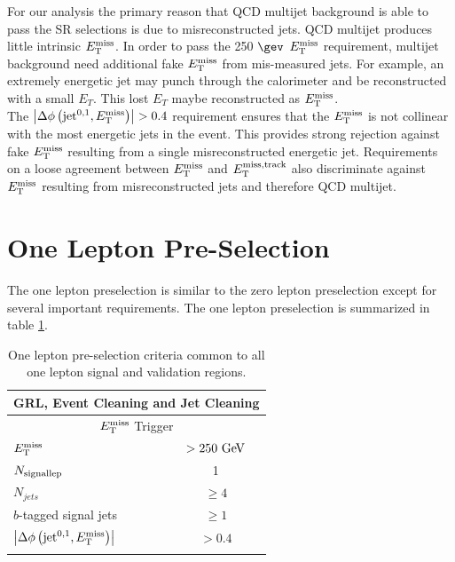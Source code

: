 \indent For our analysis the primary reason that QCD multijet background is able to pass the SR selections is due to misreconstructed jets.  QCD multijet produces little intrinsic $E_{\mathrm{T}}^{\mathrm{miss}}$.  In order to pass the 250 $\gev$ $E_{\mathrm{T}}^{\mathrm{miss}}$ requirement, multijet background need additional fake $E_{\mathrm{T}}^{\mathrm{miss}}$ from mis-measured jets.  For example, an extremely energetic jet may punch through the calorimeter and be reconstructed with a small $E_T$.  This lost $E_T$ maybe reconstructed as $E_{\mathrm{T}}^{\mathrm{miss}}$.  \\

\indent The $\left|\Delta\phi\left(\mathrm{jet}^{0,1},E_{\mathrm{T}}^{\mathrm{miss}}\right)\right| > 0.4$ requirement ensures that the $E_{\mathrm{T}}^{\mathrm{miss}}$ is not collinear with the most energetic jets in the event.  This provides strong rejection against fake $E_{\mathrm{T}}^{\mathrm{miss}}$ resulting from a single misreconstructed energetic jet.  Requirements on a loose agreement between $E_{\mathrm{T}}^{\mathrm{miss}}$ and $E_{\mathrm{T}}^{\mathrm{miss, track}}$ also discriminate against $E_{\mathrm{T}}^{\mathrm{miss}}$ resulting from misreconstructed jets and therefore QCD multijet. \\

\section{One Lepton Pre-Selection}

\indent The one lepton preselection is similar to the zero lepton preselection except for several important requirements.  The one lepton preselection is summarized in table \ref{tab:1Lcommon}. \\

\begin{table}[htbp]
  \begin{center}
    \begin{tabular}{l|c} \hline\hline
      \multicolumn{2}{c}{GRL, Event Cleaning and Jet Cleaning} \\ \hline
      \multicolumn{2}{c}{$E_{\mathrm{T}}^{\mathrm{miss}}$ Trigger} \\ \hline
      $E_{\mathrm{T}}^{\mathrm{miss}}$ & $> 250\GeV$ \\ \hline
      $N_{\rm{signal lep}}$ & 1 \\ \hline
    $N_{jets}$ & $\ge 4$ \\ \hline
      $b$-tagged signal jets & $\ge1$ \\ \hline
      $\left|\Delta\phi\left(\mathrm{jet}^{0,1},E_{\mathrm{T}}^{\mathrm{miss}}\right)\right|$ & $> 0.4$ \\
              & \\ [-2.5ex] \hline
    \end{tabular}
  \caption{ One lepton pre-selection criteria common to all one lepton signal and validation regions.}
  \end{center}
  \label{tab:1Lcommon}
\end{table}

